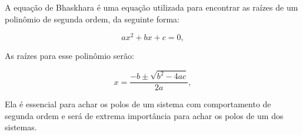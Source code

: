 A equação de Bhaskhara é uma equação utilizada para encontrar as raízes de um polinômio de segunda ordem, da seguinte forma:

\begin{equation}
    ax^2+bx+c = 0,
\end{equation}

As raízes para esse polinômio serão:

\begin{equation}
    x = \frac{-b \pm \sqrt{b^2-4ac}}{2a},
    \label{bhaskhara}
\end{equation}

Ela é essencial para achar os polos de um sistema com comportamento de segunda ordem e será de extrema importância para achar os polos de um dos sistemas.